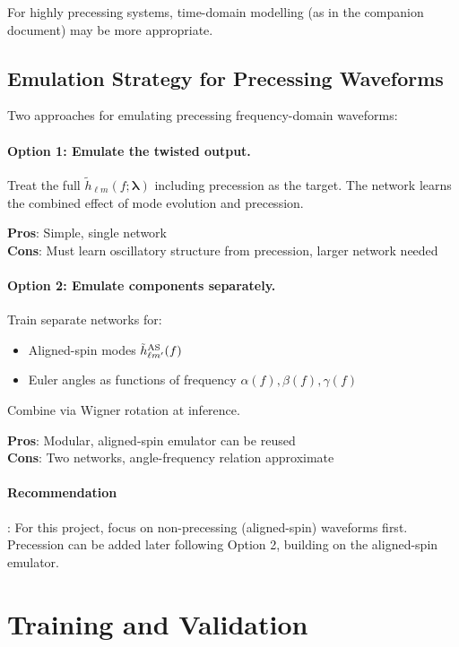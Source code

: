 \documentclass[11pt,a4paper]{article}
\newcommand{\htlm}{\tilde{h}_{\ell m}}
\newcommand{\veclambda}{\bm{\lambda}}
\begin{document}
For highly precessing systems, time-domain modelling (as in the companion document) may be more appropriate.

\subsection{Emulation Strategy for Precessing Waveforms}

Two approaches for emulating precessing frequency-domain waveforms:

\paragraph{Option 1: Emulate the twisted output.}
Treat the full $\htlm(f; \veclambda)$ including precession as the target. The network learns the combined effect of mode evolution and precession.

\textbf{Pros}: Simple, single network \\
\textbf{Cons}: Must learn oscillatory structure from precession, larger network needed

\paragraph{Option 2: Emulate components separately.}
Train separate networks for:
\begin{itemize}
    \item Aligned-spin modes $\tilde{h}^{\rm AS}_{\ell m'}(f)$
    \item Euler angles as functions of frequency $\alpha(f), \beta(f), \gamma(f)$
\end{itemize}
Combine via Wigner rotation at inference.

\textbf{Pros}: Modular, aligned-spin emulator can be reused \\
\textbf{Cons}: Two networks, angle-frequency relation approximate

\paragraph{Recommendation}: For this project, focus on non-precessing (aligned-spin) waveforms first. Precession can be added later following Option 2, building on the aligned-spin emulator.

\section{Training and Validation}
\label{sec:training}
\end{document}
